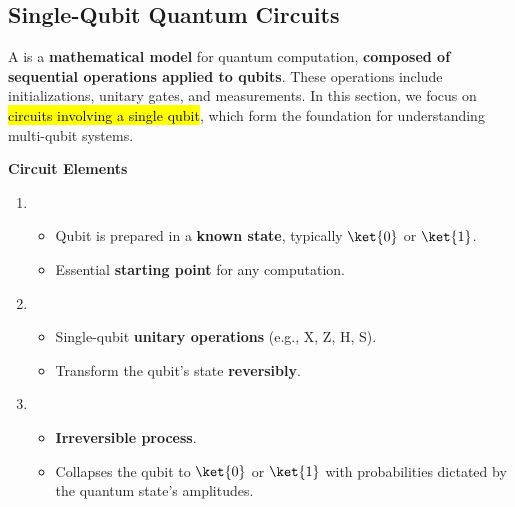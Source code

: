 \subsection{Single-Qubit Quantum Circuits}

A  is a \textbf{mathematical model} for quantum computation, \textbf{composed of sequential operations applied to qubits}. These operations include initializations, unitary gates, and measurements. In this section, we focus on \hl{circuits involving a single qubit}, which form the foundation for understanding multi-qubit systems.

\highspace
\begin{flushleft}
    \textcolor{Green3}{ \textbf{Circuit Elements}}
\end{flushleft}
\begin{enumerate}
    \item {}
    \begin{itemize}
        \item Qubit is prepared in a \textbf{known state}, typically $\ket{0}$ or $\ket{1}$.
        \item Essential \textbf{starting point} for any computation.
    \end{itemize}

    \item {}
    \begin{itemize}
        \item Single-qubit \textbf{unitary operations} (e.g., X, Z, H, S).
        \item Transform the qubit's state \textbf{reversibly}.
    \end{itemize}

    \item {}
    \begin{itemize}
        \item \textbf{Irreversible process}.
        \item Collapses the qubit to $\ket{0}$ or $\ket{1}$ with probabilities dictated by the quantum state's amplitudes.
    \end{itemize}
\end{enumerate}

